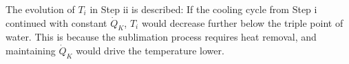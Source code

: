 The evolution of \( T_i \) in Step ii is described:  
If the cooling cycle from Step i continued with constant \( \dot{Q}_K \), \( T_i \) would decrease further below the triple point of water. This is because the sublimation process requires heat removal, and maintaining \( \dot{Q}_K \) would drive the temperature lower.